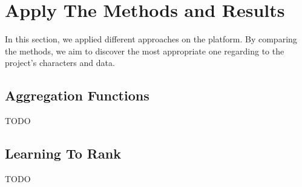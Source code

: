 \section{Apply The Methods and Results}
\label{sec:apply}
In this section, we applied different approaches on the platform. By comparing the methods, we aim to discover the most appropriate one regarding to the project's characters and data.

\subsection{Aggregation Functions}
TODO

\subsection{Learning To Rank}
TODO